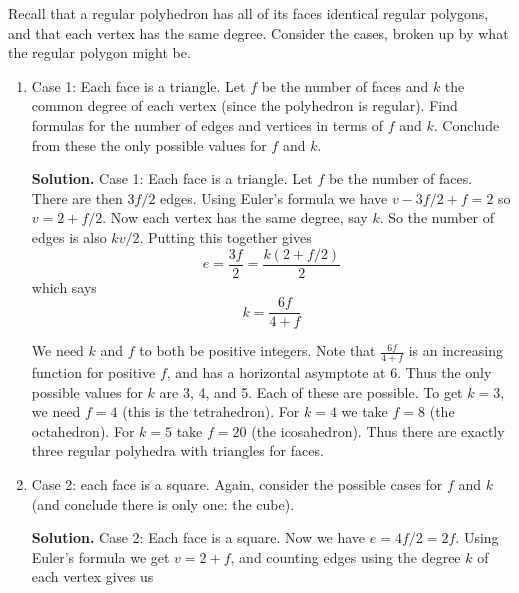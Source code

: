 \documentclass{book}
\begin{document}
\setcounter{project}{35}
\addtocounter{project}{-1}
\begin{activity}[]\label{activity-30}
\hypertarget{p-338}{}%
Recall that a regular polyhedron has all of its faces identical regular polygons, and that each vertex has the same degree. Consider the cases, broken up by what the regular polygon might be.%
\begin{enumerate}[font=\bfseries,label=(\alph*),ref=\alph*]
\item\label{task-47} \hypertarget{p-339}{}%
Case 1: Each face is a triangle.  Let \(f\) be the number of faces and \(k\) the common degree of each vertex (since the polyhedron is regular).  Find formulas for the number of edges and vertices in terms of \(f\) and \(k\).  Conclude from these the only possible values for \(f\) and \(k\).%
\par\smallskip%
\noindent\textbf{Solution.}\hypertarget{solution-32}{}\quad%
\hypertarget{p-340}{}%
Case 1: Each face is a triangle. Let \(f\) be the number of faces. There are then \(3f/2\) edges. Using Euler's formula we have \(v - 3f/2 + f = 2\) so \(v = 2 + f/2\). Now each vertex has the same degree, say \(k\). So the number of edges is also \(kv/2\). Putting this together gives%
\begin{equation*}
e = \frac{3f}{2} = \frac{k(2+f/2)}{2}
\end{equation*}
which says%
\begin{equation*}
k = \frac{6f}{4+f}
\end{equation*}
%
\par
\hypertarget{p-341}{}%
We need \(k\) and \(f\) to both be positive integers. Note that \(\frac{6f}{4+f}\) is an increasing function for positive \(f\), and has a horizontal asymptote at 6. Thus the only possible values for \(k\) are 3, 4, and 5. Each of these are possible. To get \(k = 3\), we need \(f = 4\) (this is the tetrahedron). For \(k = 4\) we take \(f = 8\) (the octahedron). For \(k = 5\) take \(f = 20\) (the icosahedron). Thus there are exactly three regular polyhedra with triangles for faces.%
\item\label{task-48} \hypertarget{p-342}{}%
Case 2: each face is a square.  Again, consider the possible cases for \(f\) and \(k\) (and conclude there is only one: the cube).%
\par\smallskip%
\noindent\textbf{Solution.}\hypertarget{solution-33}{}\quad%
\hypertarget{p-343}{}%
Case 2: Each face is a square. Now we have \(e = 4f/2 = 2f\). Using Euler's formula we get \(v = 2 + f\), and counting edges using the degree \(k\) of each vertex gives us%

\end{enumerate}
\end{activity}
\end{document}
